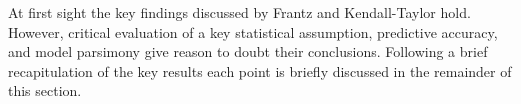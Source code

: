 At first sight the key findings discussed by Frantz and 
Kendall-Taylor hold. However, critical evaluation of a key
statistical assumption, predictive accuracy, and model 
parsimony give reason to doubt their conclusions. Following 
a brief recapitulation of the key results each point is 
briefly discussed in the remainder of this section.


